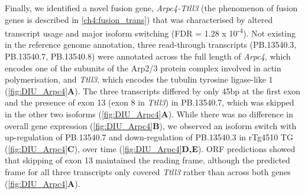 Finally, we identified a novel fusion gene, \textit{Arpc4-Ttll3} (the phenomenon of fusion genes is described in \cref{ch4:fusion_trans}) that was characterised by altered transcript usage and major isoform switching (FDR = 1.28 x 10\textsuperscript{-4}). Not existing in the reference genome annotation, three read-through transcripts (PB.13540.3, PB.13540.7, PB.13540.8) were annotated across the full length of \textit{Arpc4}, which encodes one of the subunits of the Arp2/3 protein complex involved in actin polymerisation, and \textit{Ttll3}, which encodes the tubulin tyrosine ligase-like 1 (\cref{fig:DIU_Arpc4}\textbf{A}). The three transcripts differed by only 45bp at the first exon and the presence of exon 13 (exon 8 in \textit{Ttll3}) in PB.13540.7, which was skipped in the other two isoforms (\cref{fig:DIU_Arpc4}\textbf{A}). While there was no difference in overall gene expression (\cref{fig:DIU_Arpc4}\textbf{B}), we observed an isoform switch with up-regulation of PB.13540.7 and down-regulation of PB.13540.3 in rTg4510 TG (\cref{fig:DIU_Arpc4}\textbf{C}), over time (\cref{fig:DIU_Arpc4}\textbf{D,E}). ORF predictions showed that skipping of exon 13 maintained the reading frame, although the predicted frame for all three transcripts only covered \textit{Ttll3} rather than across both genes (\cref{fig:DIU_Arpc4}\textbf{A}).  

